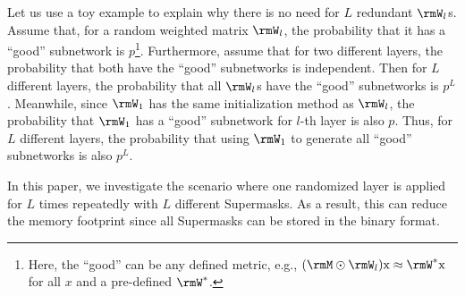 Let us use a toy example to explain why there is no need for $L$ redundant $\rmW_l$s. 
Assume that, for a random weighted matrix $\rmW_l$, the probability that it has a ``good'' subnetwork is $p$\footnote{Here, the ``good'' can be any defined metric, e.g., $(\rmM\odot\rmW_l)\text{x}\approx\rmW^*\text{x}$ for all $x$ and a pre-defined $\rmW^*$.}. 
Furthermore, assume that for two different layers, the probability that both have the ``good'' subnetworks is independent.
Then for $L$ different layers, the probability that all $\rmW_l$s have the ``good'' subnetworks is $p^L$. 
Meanwhile, since $\rmW_1$ has the same initialization method as $\rmW_l$, the probability that $\rmW_1$ has a ``good'' subnetwork for $l$-th layer is also $p$.
Thus, for $L$ different layers, the probability that using $\rmW_1$ to generate all ``good'' subnetworks is also $p^L$. 

In this paper, we investigate the scenario where one randomized layer is applied for $L$ times repeatedly with $L$ different Supermasks. 
As a result, this can reduce the memory footprint since all Supermasks can be stored in the binary format. 

